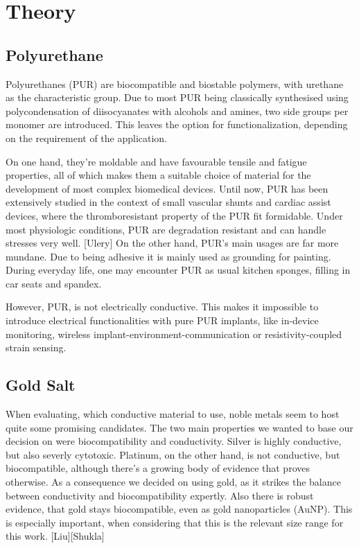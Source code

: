 \section{Theory}
\label{sec:Theory}

\subsection{Polyurethane}

Polyurethanes (PUR) are biocompatible and biostable polymers, with urethane as the characteristic group. Due to most PUR being classically synthesised using polycondensation of diisocyanates with alcohols and amines, two side groups per monomer are introduced. This leaves the option for functionalization, depending on the requirement of the application. 

On one hand, they're moldable and have favourable tensile and fatigue properties, all of which makes them a suitable choice of material for the development of most complex biomedical devices. Until now, PUR has been extensively studied in the context of small vascular shunts and cardiac assist devices, where the thromboresistant property of the PUR fit formidable. Under most physiologic conditions, PUR are degradation resistant and can handle stresses very well. [Ulery] 
On the other hand, PUR's main usages are far more mundane. Due to being adhesive it is mainly used as grounding for painting. During everyday life, one may encounter PUR as usual kitchen sponges, filling in car seats and spandex.

However, PUR, is not electrically conductive. This makes it impossible to introduce electrical functionalities with pure PUR implants, like in-device monitoring, wireless implant-environment-communication or resistivity-coupled strain sensing.



\subsection{Gold Salt}

When evaluating, which conductive material to use, noble metals seem to host quite some promising candidates. The two main properties we wanted to base our decision on were biocompatibility and conductivity. Silver is highly conductive, but also severly cytotoxic. Platinum, on the other hand, is not conductive, but biocompatible, although there's a growing body of evidence that proves otherwise. As a consequence we decided on using gold, as it strikes the balance between conductivity and biocompatibility expertly. Also there is robust evidence, that gold stays biocompatible, even as gold nanoparticles (AuNP). This is especially important, when considering that this is the relevant size range for this work. [Liu][Shukla]

